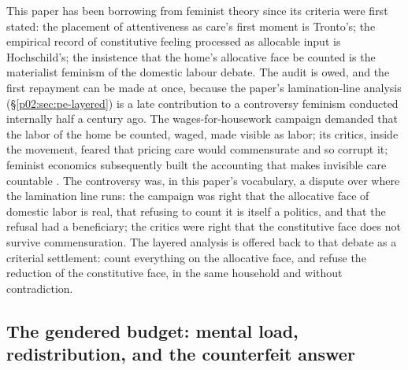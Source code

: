 This paper has been borrowing from feminist theory since its criteria were first stated: the placement of attentiveness as care's first moment is Tronto's; the empirical record of constitutive feeling processed as allocable input is Hochschild's; the insistence that the home's allocative face be counted is the materialist feminism of the domestic labour debate. The audit is owed, and the first repayment can be made at once, because the paper's lamination-line analysis (\S\ref{p02:sec:pe-layered}) is a late contribution to a controversy feminism conducted internally half a century ago. The wages-for-housework campaign \parencite{federici1975wages} demanded that the labor of the home be counted, waged, made visible as labor; its critics, inside the movement, feared that pricing care would commensurate and so corrupt it; feminist economics subsequently built the accounting that makes invisible care countable \parencite{waring1988if,folbre2001invisible}. The controversy was, in this paper's vocabulary, a dispute over where the lamination line runs: the campaign was right that the allocative face of domestic labor is real, that refusing to count it is itself a politics, and that the refusal had a beneficiary; the critics were right that the constitutive face does not survive commensuration. The layered analysis is offered back to that debate as a criterial settlement: count everything on the allocative face, and refuse the reduction of the constitutive face, in the same household and without contradiction.

\subsection{The gendered budget: mental load, redistribution, and the counterfeit answer}
\label{p02:sec:fem-load}

